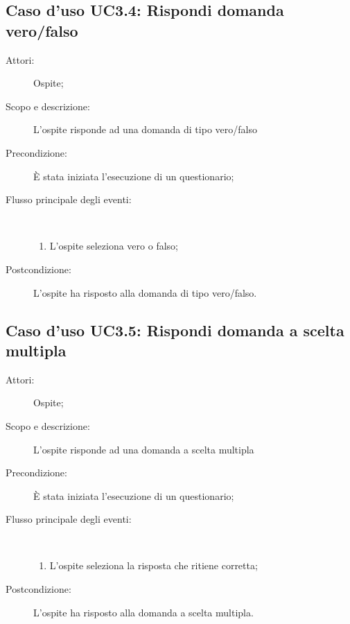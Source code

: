 \subsection{Caso d'uso UC3.4: Rispondi domanda vero/falso}\begin{description}
	\item[Attori:] Ospite;
	\item[Scopo e descrizione:] L'ospite risponde ad una domanda di tipo vero/falso
	\item[Precondizione:] È stata iniziata l'esecuzione di un questionario;
	
	\item[Flusso principale degli eventi:] \ 
	\begin{enumerate}
		\item L'ospite seleziona vero o falso;
		
	\end{enumerate}
	\item[Postcondizione:] L'ospite ha risposto alla domanda di tipo vero/falso.
\end{description}
\hypertarget{UC3.5}{}
\subsection{Caso d'uso UC3.5: Rispondi domanda a scelta multipla}\begin{description}
	\item[Attori:] Ospite;
	\item[Scopo e descrizione:] L'ospite risponde ad una domanda a scelta multipla
	\item[Precondizione:] È stata iniziata l'esecuzione di un questionario;
	
	\item[Flusso principale degli eventi:] \ 
	\begin{enumerate}
		\item L'ospite seleziona la risposta che ritiene corretta;
		
	\end{enumerate}
	\item[Postcondizione:] L'ospite ha risposto alla domanda a scelta multipla.
\end{description}
\hypertarget{UC3.6}{}
